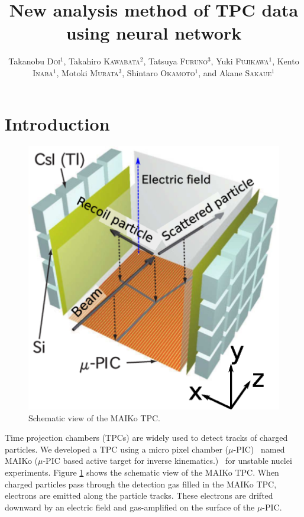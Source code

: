 \documentclass{jps-cp}
\title{New analysis method of TPC data using neural network}
\author{
  Takanobu \textsc{Doi}$^{1}$, Takahiro \textsc{Kawabata}$^{2}$, Tatsuya \textsc{Furuno}$^{3}$,
  Yuki \textsc{Fujikawa}$^{1}$, Kento \textsc{Inaba}$^{1}$, Motoki \textsc{Murata}$^{3}$,
  Shintaro \textsc{Okamoto}$^{1}$, and Akane \textsc{Sakaue}$^{1}$}
\begin{document}
\maketitle

\section{Introduction}
\begin{figure}
  \vspace{0zw}
  \centering
  \includegraphics[clip, width=15zw]{eps/MAIKo.eps}
  \caption{Schematic view of the MAIKo TPC.}
  \label{fig:MAIKo}
  \vspace{-2zw}
\end{figure}
Time projection chambers (TPCs) are widely used to detect tracks of charged particles.
We developed a TPC using a micro pixel chamber ($\mu$-PIC)~\cite{mupic} named
MAIKo ($\mu$-PIC based active target for inverse kinematics.)~\cite{MAIKo}
for unstable nuclei experiments.
Figure \ref{fig:MAIKo} shows the schematic view of the MAIKo TPC.
When charged particles pass through the detection gas filled in the MAIKo TPC,
electrons are emitted along the particle tracks.
These electrons are drifted downward by an electric field and
gas-amplified on the surface of the $\mu$-PIC.
\end{document}

